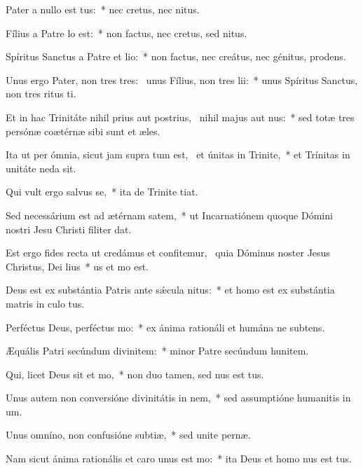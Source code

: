 \item Pater a nullo est tus:~* nec cretus, nec nitus.
\item Fílius a Patre lo est:~* non factus, nec cretus, sed nitus.
\item Spíritus Sanctus a Patre et lio:~* non factus, nec creátus, nec génitus,  prodens.
\item Unus ergo Pater, non tres tres:~\pscross{} unus Fílius, non tres lii:~* unus Spíritus Sanctus, non tres ritus ti.
\item Et in hac Trinitáte nihil prius aut postrius,~\pscross{} nihil majus aut nus:~* sed totæ tres persónæ coætérnæ sibi sunt et æles.
\item Ita ut per ómnia, sicut jam supra tum est,~\pscross{} et únitas in Trinite,~* et Trínitas in unitáte neda sit.
\item Qui vult ergo salvus se,~* ita de Trinite tiat.
\item Sed necessárium est ad ætérnam satem,~* ut Incarnatiónem quoque Dómini nostri Jesu Christi filiter dat.
\item Est ergo fides recta ut credámus et confitemur,~\pscross{} quia Dóminus noster Jesus Christus, Dei lius~* us et mo est.
\item Deus est ex substántia Patris ante sǽcula nitus:~* et homo est ex substántia matris in culo tus.
\item Perféctus Deus, perféctus mo:~* ex ánima rationáli et humána ne subtens.
\item Æquális Patri secúndum divinitem:~* minor Patre secúndum hunitem.
\item Qui, licet Deus sit et mo,~* non duo tamen, sed nus est tus.
\item Unus autem non conversióne divinitátis in nem,~* sed assumptióne humanitis in um.
\item Unus omníno, non confusióne subtiæ,~* sed unite pernæ.
\item Nam sicut ánima rationális et caro unus est mo:~* ita Deus et homo nus est tus.
